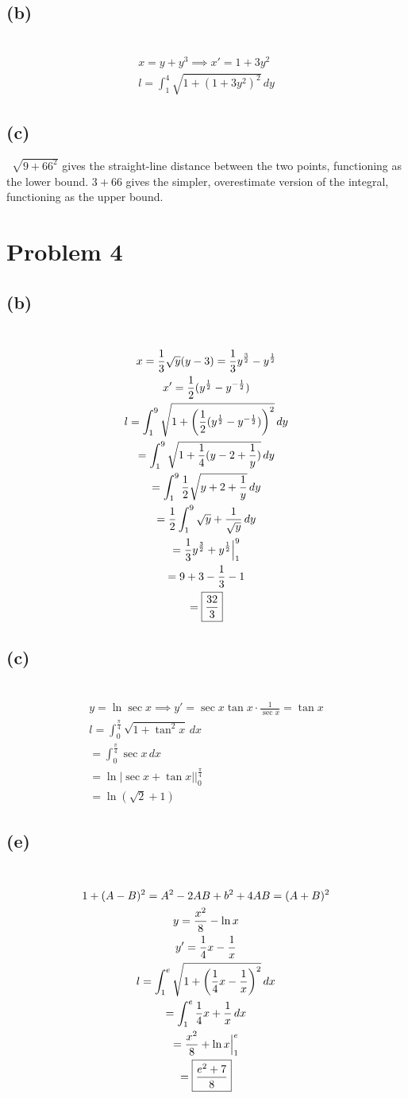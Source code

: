 \documentclass[12pt]{article}
\newcommand*{\paren}[1]{\ensuremath\left(#1\right)}
\newcommand{\at}{\Big|}
\newcommand{\problem}[1]{\section{Problem #1}}
\newcommand{\subproblem}[1]{\subsection{(#1)} \,}
\begin{document}
\subproblem{b}
\begin{gather*}
    x=y+y^3\implies x'=1+3y^2\\
    \boxed{l=\int_1^4 \sqrt{1+(1+3y^2)^2}\,dy}
\end{gather*}

\subproblem{c}
$\sqrt{9+66^2}$ gives the straight-line distance between the two points, functioning as the lower bound. $3+66$ gives the simpler, overestimate version of the integral, functioning as the upper bound.

\problem{4}

\subproblem{b}
\begin{gather*}
    x=\frac{1}{3}\sqrt{y}(y-3)= \frac{1}{3}y^\frac{3}{2}-y^\frac{1}{2}\\
    x'= \frac{1}{2}(y^\frac{1}{2}-y^{-\frac{1}{2}})\\
    l= \int_1^9 \sqrt{1+ \paren{\frac{1}{2}(y^\frac{1}{2}-y^{-\frac{1}{2}})}^2} \, dy\\
    = \int_1^9 \sqrt{1+\frac{1}{4}(y-2+\frac{1}{y})} \, dy\\
    =\int_1^9 \frac{1}{2}\sqrt{ y+2+\frac{1}{y} } \, dy\\
    = \frac{1}{2} \int_1^9 \sqrt{y} + \frac{1}{\sqrt{y}} \, dy\\
    = \frac{1}{3}y^\frac{3}{2} + y^\frac{1}{2} \at_1^9\\
    = 9 +3 - \frac{1}{3}-1 \\
    = \boxed{\frac{32}{3}}
\end{gather*}

\subproblem{c}
\begin{gather*}
    y=\ln \sec x\implies y'=  \sec x \tan x\cdot \frac{1}{\sec x}=\tan x\\
    l=\int_0^\frac{\pi}{4} \sqrt{1+\tan^2x}\,dx\\
    = \int_0^\frac{\pi}{4} \sec x\,dx\\
    = \ln |\sec x +\tan x|\at _0^\frac{\pi}{4}\\
    = \boxed{\ln (\sqrt{2}+1)}
\end{gather*}

\subproblem{e}
\begin{gather*}
    1+(A-B)^2= A^2-2AB+b^2+4AB=(A+B)^2\\
    y= \frac{x^2}{8} - \ln x\\
    y' = \frac{1}{4}x -\frac{1}{x}\\
    l=\int_1^e \sqrt{1+\paren{\frac{1}{4}x -\frac{1}{x}}^2 } \, dx\\
    = \int_1^e \frac{1}{4}x+\frac{1}{x}\, dx\\
    = \frac{x^2}{8} + \ln x\at_1^e\\
    = \boxed{\frac{e^2+7}{8}}
\end{gather*}
\end{document}
